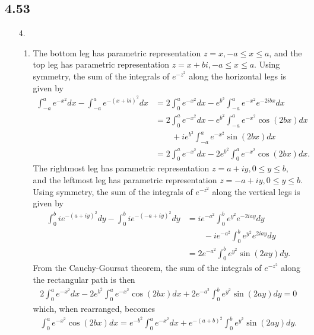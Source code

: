 \documentclass[a4paper,12pt]{article}
\begin{document}
\subsection*{4.53}
\begin{enumerate}
    \item[4.]
        \begin{enumerate}
            \item
                The bottom leg has parametric representation $z = x, -a \leq x \leq a$, and the top leg has parametric representation $z = x + bi, -a \leq x \leq a$. Using symmetry, the sum of the integrals of $e^{-z^2}$ along the horizontal legs is given by
                \begin{align*}
                    \int_{-a}^a e^{-x^2} dx - \int_{-a}^a e^{-(x + bi)^2} dx
                    &= 2 \int_0^a e^{-x^2} dx - e^{b^2} \int_{-a}^a e^{-x^2} e^{-2ibx} dx \\
                    &= 2 \int_0^a e^{-x^2} dx - e^{b^2} \int_{-a}^a e^{-x^2} \cos(2bx) dx \\
                    &\qquad+ ie^{b^2} \int_{-a}^a e^{-x^2} \sin(2bx) dx \\
                    &= 2 \int_0^a e^{-x^2} dx - 2e^{b^2} \int_0^a e^{-x^2} \cos(2bx) dx.
                \end{align*}
                The rightmost leg has parametric representation $z = a + iy, 0 \leq y \leq b$, and the leftmost leg has parametric representation $z = -a + iy, 0 \leq y \leq b$. Using symmetry, the sum of the integrals of $e^{-z^2}$ along the vertical legs is given by
                \begin{align*}
                    \int_0^b ie^{-(a + iy)^2} dy - \int_0^b ie^{-(-a + iy)^2} dy &= ie^{-a^2} \int_0^b e^{y^2} e^{-2iay} dy \\
                    &\qquad- ie^{-a^2} \int_0^b e^{y^2} e^{2iay} dy \\
                    &= 2e^{-a^2} \int_0^b e^{y^2} \sin(2ay) dy.
                \end{align*}
                From the Cauchy-Goursat theorem, the sum of the integrals of $e^{-z^2}$ along the rectangular path is then
                \begin{align*}
                    2 \int_0^a e^{-x^2} dx - 2e^{b^2} \int_0^a e^{-x^2} \cos(2bx) dx + 2e^{-a^2} \int_0^b e^{y^2} \sin(2ay) dy = 0
                \end{align*}
                which, when rearranged, becomes
                \begin{align}
                    \int_0^a e^{-x^2} \cos(2bx) dx = e^{-b^2} \int_0^a e^{-x^2} dx + e^{-(a + b)^2} \int_0^b e^{y^2} \sin(2ay) dy. \label{eq:rect}
                \end{align}


\end{enumerate}
\end{enumerate}
\end{document}
